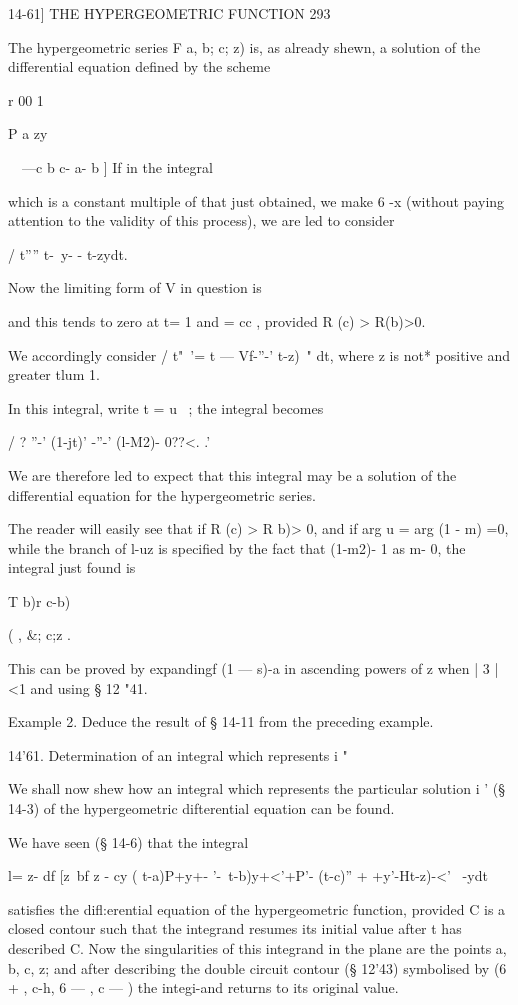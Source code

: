 14-61] THE HYPERGEOMETRIC FUNCTION 293 

The hypergeometric series F a, b; c; z) is, as already shewn, a solution of the differential 
equation defined by the scheme 

r 00 1 \ 

P   a zy 

\ \ —c b c- a- b ] 
If in the integral 

which is a constant multiple of that just obtained, we make 6  -x (without paying 
attention to the validity of this process), we are led to consider 

/ t''''  t-\ y- -  t-zydt. 

Now the limiting form of V in question is 

and this tends to zero at t= 1 and  = cc , provided R (c) > R(b)>0. 

We accordingly consider / t"~'=  t — Vf-''-'   t-z)~" dt, where z is not* positive and 
greater tlum 1. 

In this integral, write t = u~  ; the integral becomes 

/ ? ''-' (1-jt)' -''-' (l-M2)- 0??<. 
.' 

We are therefore led to expect that this integral may be a solution of the differential equation 
for the hypergeometric series. 

The reader will easily see that if R (c) > R b)> 0, and if arg u = arg (1 - m) =0, while the 
branch of l-uz is specified by the fact that (1-m2)-  1 as m- 0, the integral just 
found is 

T b)r c-b) 

  ( , \&; c;z . 

This can be proved by expandingf (1 —  s)-a in ascending powers of z when | 3 | <1 and 
using § 12 "41. 

Example 2. Deduce the result of § 14-11 from the preceding example. 

14'61. Determination of an integral which represents i "\ 

We shall now shew how an integral which represents the particular solution i '  
(§ 14-3) of the hypergeometric difterential equation can be found. 

We have seen (§ 14-6) that the integral 

l=  z- df [z~bf  z - cy (  t-a)P+y+- '-\ t-b)y+<'+P'- (t-c)'' +  +y'-Ht-z)-<'~ -ydt 

satisfies the difl:erential equation of the hypergeometric function, provided C is a closed 
contour such that the integrand resumes its initial value after t has described C. Now the 
singularities of this integrand in the  plane are the points a, b, c, z; and after describing 
the double circuit contour (§ 12'43) symbolised by (6 + , c-h, 6 — , c — ) the integi-and returns 
to its original value. 

